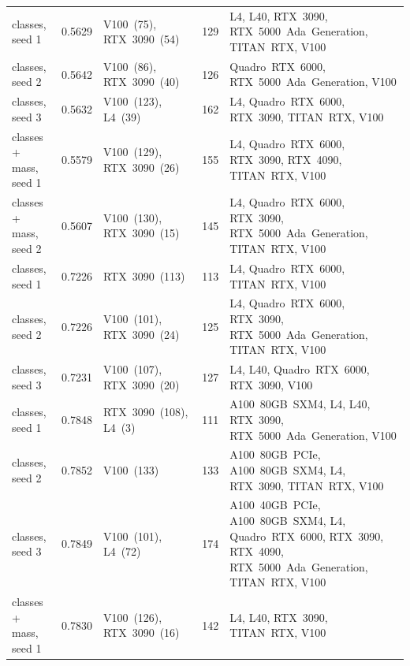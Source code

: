 \begin{landscape}
{\begin{longtable}{@{\extracolsep{\fill}}lc>{\raggedright\arraybackslash}p{5.4cm}r>{\raggedright\arraybackslash}p{6.9cm}@{}}
\Kres{} classes, seed 1 & 0.5629 & \mbox{V100 (75)}, \mbox{RTX 3090 (54)} & 129 & \mbox{L4}, \mbox{L40}, \mbox{RTX 3090}, \mbox{RTX 5000 Ada Generation}, \mbox{TITAN RTX}, \mbox{V100} \\
\Kres{} classes, seed 2 & 0.5642 & \mbox{V100 (86)}, \mbox{RTX 3090 (40)} & 126 & \mbox{Quadro RTX 6000}, \mbox{RTX 5000 Ada Generation}, \mbox{V100} \\
\Kres{} classes, seed 3 & 0.5632 & \mbox{V100 (123)}, \mbox{L4 (39)} & 162 & \mbox{L4}, \mbox{Quadro RTX 6000}, \mbox{RTX 3090}, \mbox{TITAN RTX}, \mbox{V100} \\
\Kres{} classes + mass, seed 1 & 0.5579 & \mbox{V100 (129)}, \mbox{RTX 3090 (26)} & 155 & \mbox{L4}, \mbox{Quadro RTX 6000}, \mbox{RTX 3090}, \mbox{RTX 4090}, \mbox{TITAN RTX}, \mbox{V100} \\
\Kres{} classes + mass, seed 2 & 0.5607 & \mbox{V100 (130)}, \mbox{RTX 3090 (15)} & 145 & \mbox{L4}, \mbox{Quadro RTX 6000}, \mbox{RTX 3090}, \mbox{RTX 5000 Ada Generation}, \mbox{TITAN RTX}, \mbox{V100} \\
\Kmid{} classes, seed 1 & 0.7226 & \mbox{RTX 3090 (113)} & 113 & \mbox{L4}, \mbox{Quadro RTX 6000}, \mbox{TITAN RTX}, \mbox{V100} \\
\Kmid{} classes, seed 2 & 0.7226 & \mbox{V100 (101)}, \mbox{RTX 3090 (24)} & 125 & \mbox{L4}, \mbox{Quadro RTX 6000}, \mbox{RTX 3090}, \mbox{RTX 5000 Ada Generation}, \mbox{TITAN RTX}, \mbox{V100} \\
\Kmid{} classes, seed 3 & 0.7231 & \mbox{V100 (107)}, \mbox{RTX 3090 (20)} & 127 & \mbox{L4}, \mbox{L40}, \mbox{Quadro RTX 6000}, \mbox{RTX 3090}, \mbox{V100} \\
\Kcoarse{} classes, seed 1 & 0.7848 & \mbox{RTX 3090 (108)}, \mbox{L4 (3)} & 111 & \mbox{A100 80GB SXM4}, \mbox{L4}, \mbox{L40}, \mbox{RTX 3090}, \mbox{RTX 5000 Ada Generation}, \mbox{V100} \\
\Kcoarse{} classes, seed 2 & 0.7852 & \mbox{V100 (133)} & 133 & \mbox{A100 80GB PCIe}, \mbox{A100 80GB SXM4}, \mbox{L4}, \mbox{RTX 3090}, \mbox{TITAN RTX}, \mbox{V100} \\
\Kcoarse{} classes, seed 3 & 0.7849 & \mbox{V100 (101)}, \mbox{L4 (72)} & 174 & \mbox{A100 40GB PCIe}, \mbox{A100 80GB SXM4}, \mbox{L4}, \mbox{Quadro RTX 6000}, \mbox{RTX 3090}, \mbox{RTX 4090}, \mbox{RTX 5000 Ada Generation}, \mbox{TITAN RTX}, \mbox{V100} \\
\Kcoarse{} classes + mass, seed 1 & 0.7830 & \mbox{V100 (126)}, \mbox{RTX 3090 (16)} & 142 & \mbox{L4}, \mbox{L40}, \mbox{RTX 3090}, \mbox{TITAN RTX}, \mbox{V100} \\

\end{longtable}}
\end{landscape}
